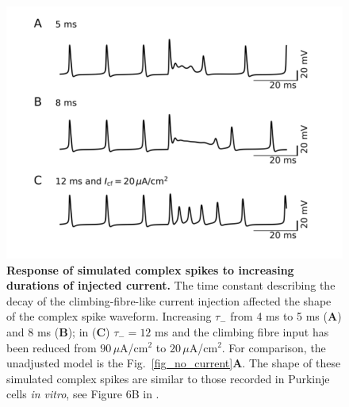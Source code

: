 \documentclass[twocolumn]{svjour3}          %
\begin{document}
\begin{figure}[!ht]
  \includegraphics[width=\linewidth]{figure_tau_minus.jpg}
\caption{\textbf {Response of simulated complex spikes to increasing
    durations of injected current.} The time constant describing the
  decay of the climbing-fibre-like current injection affected the
  shape of the complex spike waveform. Increasing $\tau_-$ from 4 ms
  to 5 ms (\textbf{A}) and 8 ms (\textbf{B}); in (\textbf{C})
  $\tau_-=12$ ms and the climbing fibre input has been reduced from
  $90\,\mu$A/cm$^2$ to $20\,\mu$A/cm$^2$. For comparison, the
  unadjusted model is the Fig.~\ref{fig_no_current}\textbf{A}. The
  shape of these simulated complex spikes are similar to those
  recorded in Purkinje cells \textit{in vitro}, see Figure 6B in
  \protect\citet{MonsivaisEtAl2005}.
\label{fig:injection_durations}}
\end{figure}
\end{document}
